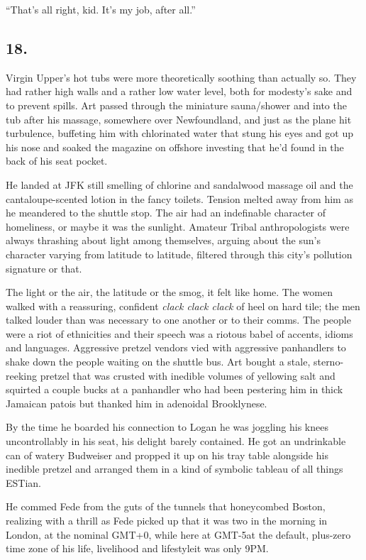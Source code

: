 “That’s all right, kid. It’s my job, after all.”

\subsection{18.}

Virgin Upper’s hot tubs were more theoretically soothing than
actually so. They had rather high walls and a rather low water
level, both for modesty’s sake and to prevent spills. Art passed
through the miniature sauna/shower and into the tub after his
massage, somewhere over Newfoundland, and just as the plane hit
turbulence, buffeting him with chlorinated water that stung his
eyes and got up his nose and soaked the magazine on offshore
investing that he’d found in the back of his seat pocket.

He landed at JFK still smelling of chlorine and sandalwood massage
oil and the cantaloupe-scented lotion in the fancy toilets. Tension
melted away from him as he meandered to the shuttle stop. The air
had an indefinable character of homeliness, or maybe it was the
sunlight. Amateur Tribal anthropologists were always thrashing
about light among themselves, arguing about the sun’s character
varying from latitude to latitude, filtered through this city’s
pollution signature or that.

The light or the air, the latitude or the smog, it felt like home.
The women walked with a reassuring, confident
\emph{clack clack clack} of heel on hard tile; the men talked
louder than was necessary to one another or to their comms. The
people were a riot of ethnicities and their speech was a riotous
babel of accents, idioms and languages. Aggressive pretzel vendors
vied with aggressive panhandlers to shake down the people waiting
on the shuttle bus. Art bought a stale, sterno-reeking pretzel that
was crusted with inedible volumes of yellowing salt and squirted a
couple bucks at a panhandler who had been pestering him in thick
Jamaican patois but thanked him in adenoidal Brooklynese.

By the time he boarded his connection to Logan he was joggling his
knees uncontrollably in his seat, his delight barely contained. He
got an undrinkable can of watery Budweiser and propped it up on his
tray table alongside his inedible pretzel and arranged them in a
kind of symbolic tableau of all things ESTian.

He commed Fede from the guts of the tunnels that honeycombed
Boston, realizing with a thrill as Fede picked up that it was two
in the morning in London, at the nominal GMT+0, while here at
GMT-5{\dash}at the default, plus-zero time zone of his life, livelihood
and lifestyle{\dash}it was only 9PM.

